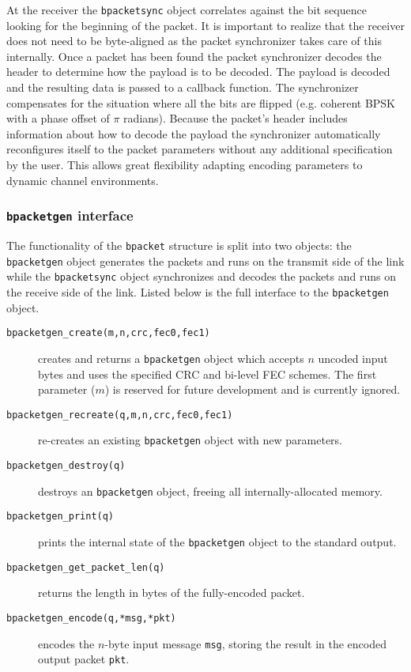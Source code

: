 At the receiver
the {\tt bpacketsync} object correlates against the bit sequence looking
for the beginning of the packet.
It is important to realize that the receiver does not need to be
byte-aligned as the packet synchronizer takes care of this internally.
Once a packet has been found the packet synchronizer decodes the header
to determine how the payload is to be decoded.
The payload is decoded and the resulting data is passed to a callback
function.
The synchronizer compensates for the situation where all the bits are
flipped (e.g. coherent BPSK with a phase offset of $\pi$ radians).
Because the packet's header includes information about how to decode the
payload the synchronizer automatically reconfigures itself to the packet
parameters without any additional specification by the user.
This allows great flexibility adapting encoding parameters to dynamic
channel environments.


\subsubsection{{\tt bpacketgen} interface}
\label{module:framing:bpacket:bpacketgen}
The functionality of the {\tt bpacket} structure is split into two
objects:
the {\tt bpacketgen} object generates the packets and runs on the
transmit side of the link while
the {\tt bpacketsync} object synchronizes and decodes the packets and
runs on the receive side of the link.
Listed below is the full interface to the {\tt bpacketgen} object.
%
\begin{description}
\item[{\tt bpacketgen\_create(m,n,crc,fec0,fec1)}]
    creates and returns a {\tt bpacketgen} object which accepts $n$
    uncoded input bytes and uses the specified CRC and bi-level FEC
    schemes.
    The first parameter ($m$) is reserved for future development and is
    currently ignored.
\item[{\tt bpacketgen\_recreate(q,m,n,crc,fec0,fec1)}]
    re-creates an existing {\tt bpacketgen} object with new parameters.
\item[{\tt bpacketgen\_destroy(q)}]
    destroys an {\tt bpacketgen} object, freeing all
    internally-allocated memory.
\item[{\tt bpacketgen\_print(q)}]
    prints the internal state of the {\tt bpacketgen} object to the
    standard output.
\item[{\tt bpacketgen\_get\_packet\_len(q)}]
    returns the length in bytes of the fully-encoded packet.
\item[{\tt bpacketgen\_encode(q,*msg,*pkt)}]
    encodes the $n$-byte input message {\tt msg},
    storing the result in the encoded output packet {\tt pkt}.
\end{description}
%


